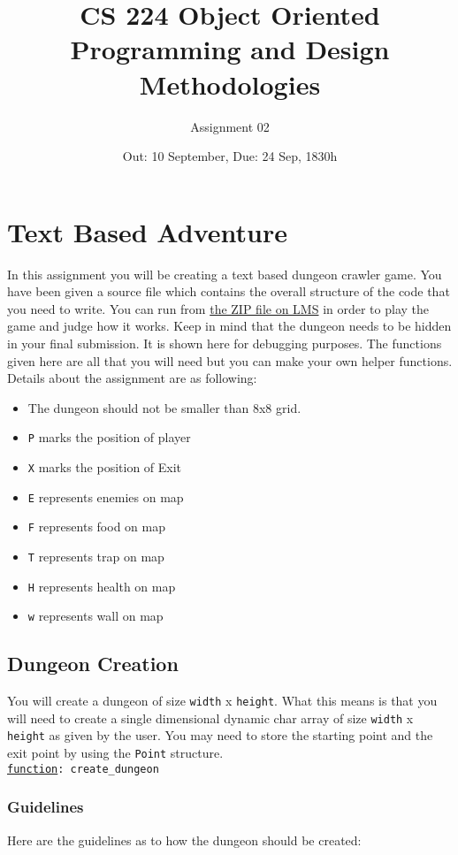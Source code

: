 \documentclass[a4paper,12pt]{article}
\title{CS 224 Object Oriented Programming and Design Methodologies}
\author{Assignment 02}
\date{Out: 10 September, Due: 24 Sep, 1830h}
\newcommand{\func}[1]{\\{\tt \ul{function}: #1}}
\begin{document}
\maketitle

\section{Text Based Adventure}
In this assignment you will be creating a text based dungeon crawler game. You have been given a source file  which contains the overall structure of the code that you need to write. You can run  from \href{https://lms.habib.edu.pk/portal/site/684809f6-2cec-479c-8910-2f0b77a8793c}{the ZIP file on LMS} in order to play the game and judge how it works. Keep in mind that the dungeon needs to be hidden in your final submission. It is shown here for debugging purposes. The functions given here are all that you will need but you can make your own helper functions. Details about the assignment are as following:

\begin{itemize}
\item The dungeon should not be smaller than 8x8 grid.
\item {\tt P} marks the position of player
\item {\tt X} marks the position of Exit
\item {\tt E} represents enemies on map
\item {\tt F} represents food on map
\item {\tt T} represents trap on map
\item {\tt H} represents health on map
\item {\tt w} represents wall on map
\end{itemize}

\subsection{Dungeon Creation}
You will create a dungeon of size {\tt width} x {\tt height}. What this means is that you will need to create a single dimensional dynamic char array of size {\tt width} x {\tt height} as given by the user. You may need to store the starting point and the exit point by using the {\tt Point} structure. 
\func{create\_dungeon}

\subsubsection*{Guidelines}
Here are the guidelines as to how the dungeon should be created:
\end{document}
